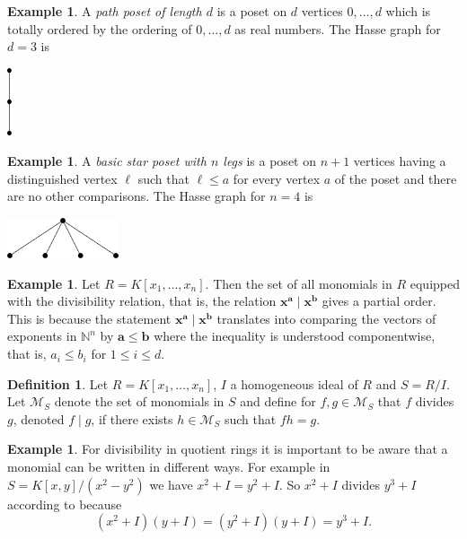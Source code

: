 \documentclass[11pt]{amsart}
\newcommand{\N}{{\mathbb N}}
\newcommand{\ba}{{\mathbf a}}
\newcommand{\bb}{{\mathbf b}}
\newcommand{\bx}{{\mathbf x}}
\newcommand{\M}{{\mathcal M}}
\theoremstyle{plain} %
\theoremstyle{definition}
\newtheorem{defn}[thm]{Definition}
\newtheorem{ex}[thm]{Example}
\theoremstyle{remark}
\numberwithin{equation}{section}  %
\begin{document}
\begin{ex}
A {\em path poset of length $d$} is a poset on $d$ vertices $0,\ldots, d$ which is totally ordered by the ordering of $0,\ldots, d$ as real numbers. The Hasse graph for $d=3$ is
\begin{center}
\includegraphics[height=2cm]{Pictures/Spider_legs_1_length_2.pdf}
\end{center}
\end{ex}

\begin{ex}
A {\em basic star poset with $n$ legs} is a poset on $n+1$ vertices having a distinguished vertex $\ell$ such that $\ell\leq a$ for every vertex $a$ of the poset and there are no other comparisons. The Hasse graph for $n=4$ is 
\begin{center}
\includegraphics[height=1.2cm]{Pictures/Star_legs_4.pdf}
\end{center}
\end{ex}


\begin{ex}
 Let $R=K[x_1,\dots, x_n]$. Then the set of all monomials in $R$ equipped with the divisibility relation, that is,  the relation $\bx^\ba \mid \bx^\bb$ gives a partial order. This is because the statement $\bx^\ba \mid \bx^\bb$ translates into comparing the vectors of exponents in $\N^n$ by $\ba\leq \bb$ where the inequality is understood componentwise, that is, $a_i\leq b_i$ for $1\leq i\leq d$.  
\end{ex}

\begin{tcolorbox}
\begin{defn}\label{def: divisibility}
 Let $R=K[x_1,\dots, x_n]$, $I$ a homogeneous ideal of $R$ and $S=R/I$. Let $\M_S$ denote the set of monomials in $S$ and define for $f,g\in\M_S$ that $f$ divides $g$, denoted $f\mid g$, if  there exists $h \in\M_S$ such that $fh=g$.
 \end{defn}
 \end{tcolorbox}
 
 \begin{ex}\label{ex: x^2-y^2}
For divisibility  in quotient rings it is important to be aware that a monomial can be written in different ways. For example in $S=K[x,y]/(x^2-y^2)$ we have $x^2+I=y^2+I$. So  $x^2+I$ divides $y^3+I$ according to  because 
\[
(x^2+I)(y+I)=(y^2+I)(y+I)=y^3+I.
\]
 \end{ex}
\end{document}
